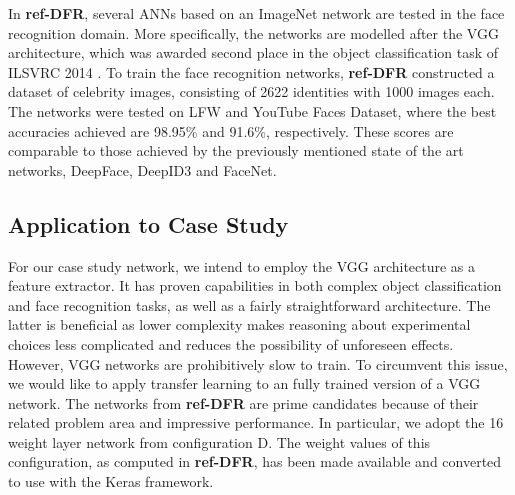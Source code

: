 \noindent In \textbf{ref-DFR}, several ANNs based on an ImageNet network are tested in the face recognition domain. More specifically, the networks are modelled after the VGG architecture, which was awarded second place in the object classification task of ILSVRC 2014 \cite{vgg}. To train the face recognition networks, \textbf{ref-DFR} constructed a dataset of celebrity images, consisting of 2622 identities with 1000 images each. The networks were tested on LFW and YouTube Faces Dataset, where the best accuracies achieved are 98.95\% and 91.6\%, respectively. These scores are comparable to those achieved by the previously mentioned state of the art networks, DeepFace, DeepID3 and FaceNet.

\subsection{Application to Case Study} \label{vggface-application}

For our case study network, we intend to employ the VGG architecture as a feature extractor. It has proven capabilities in both complex object classification and face recognition tasks, as well as a fairly straightforward architecture. The latter is beneficial as lower complexity makes reasoning about experimental choices less complicated and reduces the possibility of unforeseen effects. However, VGG networks are prohibitively slow to train. To circumvent this issue, we would like to apply transfer learning to an fully trained version of a VGG network. The networks from \textbf{ref-DFR} are prime candidates because of their related problem area and impressive performance. In particular, we adopt the 16 weight layer network from configuration D. The weight values of this configuration, as computed in \textbf{ref-DFR}, has been made available and converted to use with the Keras framework.


\cleardoublepage